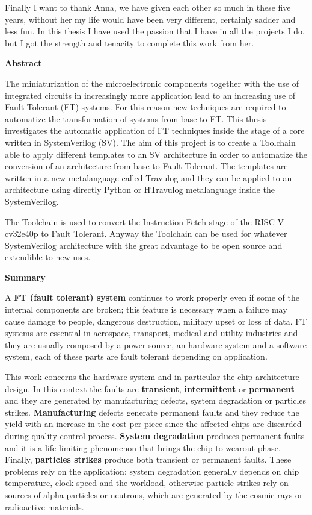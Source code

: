 \documentclass[corpo=11pt,english,numerazioneromana]{toptesi}
\begin{document}
Finally I want to thank Anna, we have given each other so much in these five years, without her my life would have been very different, certainly sadder and less fun. In this thesis I have used the passion that I have in all the projects I do, but I got the strength and tenacity to complete this work from her.

\newpage
{\Huge \textbf{Abstract} \par}
\vspace{.3in}
The miniaturization of the microelectronic components together with the use of integrated circuits in increasingly more application lead to an increasing use of Fault Tolerant (FT) systems. For this reason new techniques are required to automatize the transformation of systems from base to FT.  This thesis investigates the automatic application of FT techniques inside the stage of a core written in SystemVerilog (SV). The aim of this project is to create a Toolchain able to apply different templates to an SV architecture in order to automatize the conversion of an architecture from base to Fault Tolerant. The templates  are written in a new metalanguage called Travulog and they can be applied to an architecture using directly Python or HTravulog metalanguage inside the SystemVerilog. 



The Toolchain is used to convert the Instruction Fetch stage of the RISC-V cv32e40p to Fault Tolerant. Anyway the Toolchain can be used for whatever SystemVerilog architecture with the great advantage to be open source and extendible to new uses.


\newpage
{\Huge \textbf{Summary} \par}
\vspace{.3in}
A \textbf{ FT (fault tolerant) system} continues to work properly even if some of the internal components are broken; this feature is necessary when a failure may cause damage to people, dangerous destruction, military upset or loss of data. FT systems are essential in aerospace, transport, medical and utility industries and they are usually composed by a power source, an hardware system and a software system, each of these parts are fault tolerant depending on application.

This work concerns the hardware system and in particular the chip architecture design. In this context the faults are \textbf{transient}, \textbf{intermittent} or \textbf{permanent} and they are generated by manufacturing defects, system degradation or particles strikes.\textbf{ Manufacturing} defects generate permanent faults and they reduce the yield with an increase in the cost per piece since the affected chips are discarded during quality control process. \textbf{System degradation} produces permanent faults and it is a life-limiting phenomenon that brings the chip to wearout phase. Finally, \textbf{particles strikes} produce both transient or permanent faults. 
These problems rely on the application: system degradation generally depends on chip temperature, clock speed and the workload, otherwise particle strikes rely on sources of alpha particles or neutrons, which are generated by the cosmic rays or radioactive materials.
\end{document}
